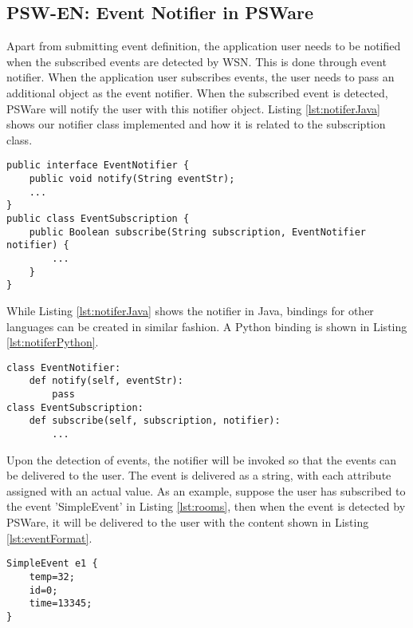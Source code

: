 \subsection{PSW-EN: Event Notifier in PSWare}
Apart from submitting event definition, the application user needs to be notified when the subscribed events are detected by WSN. This is done through event notifier. When the application user subscribes events, the user needs to pass an additional object as the event notifier. When the subscribed event is detected, PSWare will notify the user with this notifier object. Listing \ref{lst:notiferJava} shows our notifier class implemented and how it is related to the subscription class.

\begin{lstlisting}[caption=Event notifier in Java, label=lst:notiferJava]
public interface EventNotifier {
	public void notify(String eventStr);
	...
}
public class EventSubscription {
	public Boolean subscribe(String subscription, EventNotifier notifier) {
		...
	}
}
\end{lstlisting}

While Listing \ref{lst:notiferJava} shows the notifier in Java, bindings for other languages can be created in similar fashion. A Python binding is shown in Listing \ref{lst:notiferPython}.
\begin{lstlisting}[caption=Python binding of event notifier, label=lst:notiferPython]
class EventNotifier:
	def notify(self, eventStr):
		pass
class EventSubscription:
	def subscribe(self, subscription, notifier):
		...
\end{lstlisting}

Upon the detection of events, the notifier will be invoked so that the events can be delivered to the user. The event is delivered as a string, with each attribute assigned with an actual value. As an example, suppose the user has subscribed to the event 'SimpleEvent' in Listing \ref{lst:rooms}, then when the event is detected by PSWare, it will be delivered to the user with the content shown in Listing \ref{lst:eventFormat}.
\begin{lstlisting}[caption=Received event from notifier, label=lst:eventFormat]
SimpleEvent e1 {
	temp=32;
	id=0;
	time=13345;
}
\end{lstlisting}

